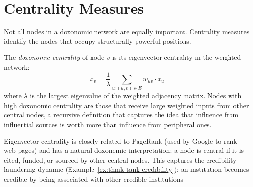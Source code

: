 \section{Centrality Measures}
\label{sec:ch15-centrality}

Not all nodes in a doxonomic network are equally important.
Centrality measures identify the nodes that occupy structurally powerful positions.

\begin{definition}
\label{def:centrality}
The \emph{doxonomic centrality} of node $v$ is its eigenvector centrality in the weighted network:
\[
  x_v = \frac{1}{\lambda} \sum_{u: (u,v) \in E} w_{uv} \cdot x_u
\]
where $\lambda$ is the largest eigenvalue of the weighted adjacency matrix.
Nodes with high doxonomic centrality are those that receive large weighted inputs from other central nodes, a recursive definition that captures the idea that influence from influential sources is worth more than influence from peripheral ones.
\end{definition}

Eigenvector centrality is closely related to PageRank (used by Google to rank web pages) and has a natural doxonomic interpretation: a node is central if it is cited, funded, or sourced by other central nodes.
This captures the credibility-laundering dynamic (Example~\ref{ex:think-tank-credibility}): an institution becomes credible by being associated with other credible institutions.

